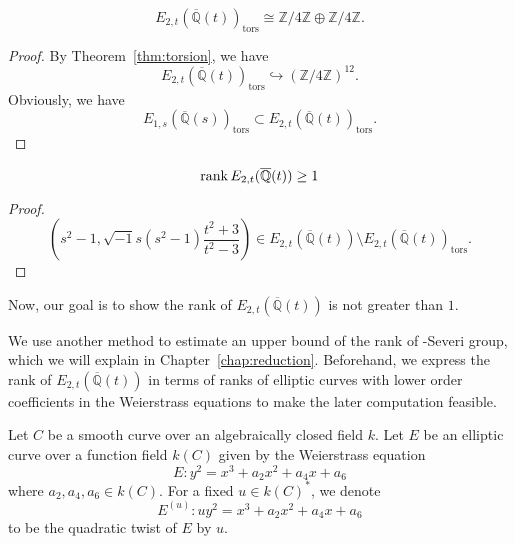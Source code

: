 \documentclass[main]{subfiles}
\begin{document}
\begin{lem}
    \begin{equation}
        E_{2,t}(\overline{\mathbb{Q}}(t))_{\text{tors}} \cong \mathbb{Z} / 4 \mathbb{Z} \oplus \mathbb{Z} / 4 \mathbb{Z}.
    \end{equation}
\end{lem}
\begin{proof}
    By Theorem~\ref{thm:torsion}, we have
    \begin{equation}
        E_{2,t}(\overline{\mathbb{Q}}(t))_{\text{tors}} \hookrightarrow (\mathbb{Z} / 4 \mathbb{Z})^{12}.
    \end{equation}
    Obviously, we have
    \begin{equation}
        E_{1,s}(\overline{\mathbb{Q}}(s))_{\text{tors}} \subset E_{2,t}(\overline{\mathbb{Q}}(t))_{\text{tors}}.
    \end{equation}
\end{proof}

\begin{lem}
    \begin{equation}
        \operatorname{rank} E_{2,t}(\overline{\mathbb{Q}}(t)) \geq 1
    \end{equation}
\end{lem}
\begin{proof}
    \begin{equation}
        \left(s^{2} - 1, \sqrt{-1} s(s^{2} - 1) \frac{t^{2} + 3}{t^{2} - 3} \right) \in E_{2,t}(\overline{\mathbb{Q}}(t)) \setminus E_{2,t}(\overline{\mathbb{Q}}(t))_{\text{tors}}.
    \end{equation}
\end{proof}
Now, our goal is to show the rank of $E_{2,t}(\overline{\mathbb{Q}}(t))$ is not greater than $1$.

We use another method to estimate an upper bound of the rank of \Neron-Severi group, which we will explain in Chapter~\ref{chap:reduction}.
Beforehand, we express the rank of $E_{2,t}(\overline{\mathbb{Q}}(t))$ in terms of ranks of elliptic curves with lower order coefficients in the Weierstrass equations to make the later computation feasible.

\begin{dfn}
    Let $C$ be a smooth curve over an algebraically closed field $k$.
    Let $E$ be an elliptic curve over a function field $k(C)$ given by the Weierstrass equation
    \begin{equation}
        E: y^{2} = x^{3} + a_{2} x^{2} + a_{4} x + a_{6}
    \end{equation}
    where $a_{2}, a_{4}, a_{6} \in k(C)$.
    For a fixed $u \in k(C)^*$, we denote
    \begin{equation}
        E^{(u)}: u y^{2} = x^{3} + a_{2} x^{2} + a_{4} x + a_{6}
    \end{equation}
    to be the quadratic twist of $E$ by $u$.
\end{dfn}
\end{document}
